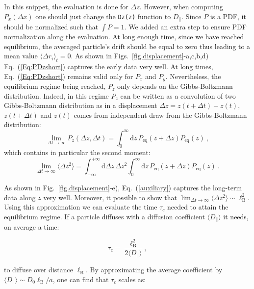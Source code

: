 In this snippet, the evaluation is done for $\Delta z$. However, when computing $P_x(\Delta x)$ one should just change the \texttt{Dz(z)} function to $D_\parallel$. Since $P$ is a \gls{PDF}, it should be normalized such that $\int P = 1$. We added an extra step to ensure \gls{PDF} normalization along the evaluation.
At long enough time, since we have reached equilibrium, the averaged particle's drift should be equal to zero thus leading to a mean value $\langle \Delta r_i \rangle_t  = 0$. As shown in Figs.~\ref{fig.displacement}-a,c,b,d) Eq.~(\ref{Eq:PDzshort}) captures the early data very well. At long times, Eq.~(\ref{Eq:PDzshort}) remains valid only for $P_x$ and $P_y$. Nevertheless, the equilibrium regime being reached, $P_z$ only depends on the Gibbs-Boltzmann distribution. Indeed, in this regime $P_z$ can be written as a convolution of two Gibbs-Boltzmann distribution as in a displacement $\Delta z = z(t+\Delta t) - z(t)$, $ z(t+\Delta t)$ and  $z(t)$ comes from independent draw from the Gibbs-Boltzmann distribution:
\begin{equation}
	\lim_{\Delta t\rightarrow\infty}P_z(\Delta z, \Delta t) = \int_0^{\infty}\textrm{d}z\,P_{\textrm{eq}}(z+\Delta z)P_{\textrm{eq}}(z)\ ,
	\label{auxiliary}
\end{equation}
which contains in particular the second moment:
\begin{equation}
	\lim_{\Delta t\rightarrow\infty}\langle\Delta z ^2\rangle = \int _{- \infty} ^{+ \infty}\textrm{d}\Delta z\, \Delta z^2\int_0^{\infty}\textrm{d}z\, P_{\textrm{eq}}(z+\Delta z)P_{\textrm{eq}}(z) \ .   
	\label{Eq:plateau}
\end{equation}

As shown in Fig.~\ref{fig.displacement}-e), Eq.~(\ref{auxiliary}) captures the long-term data along $z$ very well. Moreover, it possible to show that $\lim_{\Delta t\rightarrow\infty}\langle\Delta z ^2\rangle \sim \ell _\mathrm{B}^2$. Using this approximation we can evaluate the time $\tau_c$ needed to attain the equilibrium regime. If a particle diffuses with a diffusion coefficient $\langle D_\parallel \rangle$ it needs, on average a time: 

\begin{equation}
	\tau_c = \frac{\ell_\mathrm{B}^2}{2\langle D_\parallel \rangle},
\end{equation}

to diffuse over distance $\ell_\mathrm{B}$. By approximating the average coefficient by $\langle D_\parallel \rangle \sim D_0 \ell_\mathrm{B}/ a $, one can find that $\tau_c$ scales as:

